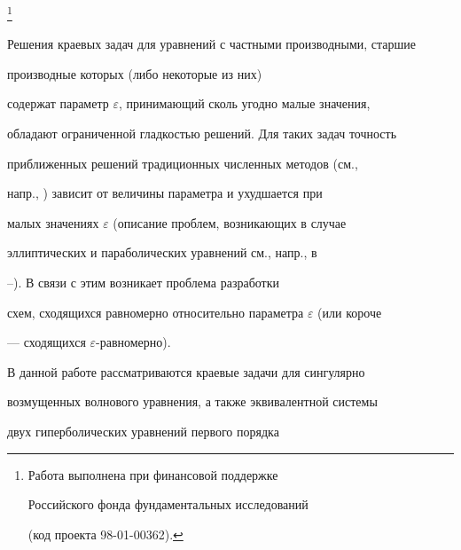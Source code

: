 \thanks{Работа выполнена при финансовой поддержке


Российского фонда фундаментальных исследований


(код проекта 98-01-00362).}





\date{}




\pagestyle{plain} %







\maketitle


\label{begin}





Решения краевых задач для уравнений с частными производными, старшие


производные которых (либо некоторые из них)


содержат параметр $\varepsilon$, принимающий сколь угодно малые значения,


обладают ограниченной гладкостью решений. Для таких задач точность


приближенных решений традиционных численных методов (см.,


напр., \cite{2}) зависит от величины параметра и ухудшается при


малых значениях $\varepsilon$ (описание проблем, возникающих в случае


эллиптических и параболических уравнений см., напр., в


\cite{3}--\cite{8}). В связи с этим возникает проблема разработки


схем, сходящихся равномерно относительно параметра $\varepsilon$ (или короче


--- сходящихся $\varepsilon$-равномерно).





В данной работе рассматриваются краевые задачи для сингулярно


возмущенных волнового уравнения, а также эквивалентной системы


двух гиперболических уравнений первого порядка



